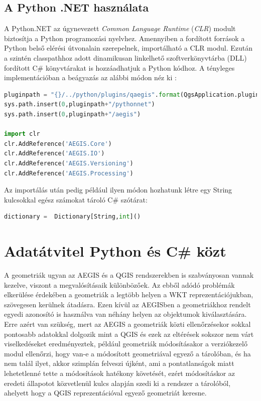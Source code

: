 \subsection{A Python .NET használata}
A Python.NET az úgynevezett \emph{Common Language Runtime} (\emph{CLR}) modult biztosítja a Python programozási nyelvhez. Amennyiben a fordított források a Python belső elérési útvonalain szerepelnek, importálható a CLR modul. Ezután a szintén classpathhoz adott dinamikusan linkelhető szoftverkönyvtárba (DLL) fordított C\# könyvtárakat is hozzáadhatjuk a Python kódhoz. A tényleges implementációban a beágyazás az alábbi módon néz ki :
\begin{lstlisting}[language={python}]
pluginpath = "{}/../python/plugins/qaegis".format(QgsApplication.pluginPath())
sys.path.insert(0,pluginpath+"/pythonnet")
sys.path.insert(0,pluginpath+"/aegis")

import clr
clr.AddReference('AEGIS.Core')
clr.AddReference('AEGIS.IO')
clr.AddReference('AEGIS.Versioning')
clr.AddReference('AEGIS.Processing')
\end{lstlisting}
Az importálás után pedig például ilyen módon hozhatunk létre egy String kulcsokkal egész számokat tároló C\# szótárat:
\begin{lstlisting}[language={python}]
dictionary =  Dictionary[String,int]()
\end{lstlisting}

\section{Adatátvitel Python és C\# közt}
A geometriák ugyan az AEGIS és a QGIS rendszerekben is szabványosan vannak kezelve, viszont a megvalósításaik különbözőek. Az ebből adódó problémák elkerülése érdekében a geometriák a legtöbb helyen a WKT reprezentációjukban, szövegesen kerülnek átadásra. Ezen kívül az AEGISben a geometriákhoz rendelt egyedi azonosító is használva van néhány helyen az objektumok kiválasztására. Erre azért van szükség, mert az AEGIS a geometriák közti ellenőrzésekor sokkal pontosabb adatokkal dolgozik mint a QGIS és ezek az eltérések sokszor nem várt viselkedéseket eredményeztek, például geometriák módosításakor a verziókezelő modul ellenőrzi, hogy van-e a módosított geometriával egyező a tárolóban, és ha nem talál ilyet, akkor szimplán felveszi újként, ami a pontatlanságok miatt lehetetlenné tette a módosítások hatékony követését, ezért módosításkor az eredeti állapotot közvetlenül kulcs alapján szedi ki a rendszer a tárolóból, ahelyett hogy a QGIS reprezentációval egyező geometriát keresne.

